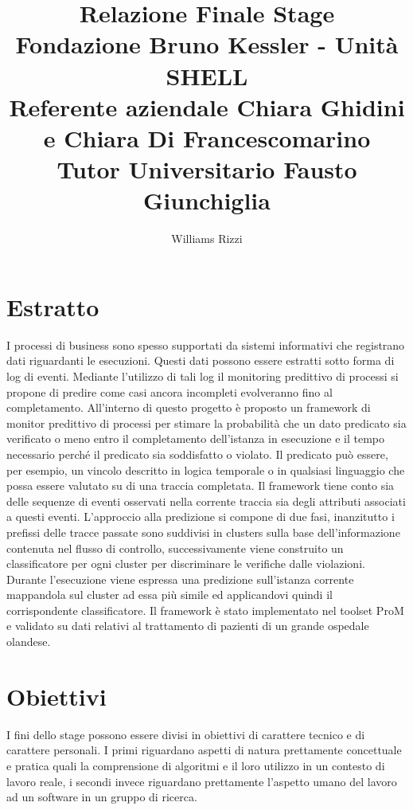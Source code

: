 \documentclass[11pt]{article} %
\title{%
	Relazione Finale Stage\\
 	 \large Fondazione Bruno Kessler - Unità SHELL \\
   	 Referente aziendale Chiara Ghidini e Chiara Di Francescomarino\\
	Tutor Universitario Fausto Giunchiglia}
\author{Williams Rizzi}
\begin{document}
\maketitle

\section{Estratto}
I processi di business sono spesso supportati da sistemi informativi che registrano dati riguardanti le esecuzioni. Questi dati possono essere estratti sotto forma di log di eventi. Mediante l'utilizzo di tali log il monitoring predittivo di processi si propone di predire come casi ancora incompleti evolveranno fino al completamento. All'interno di questo progetto è proposto un framework di monitor predittivo di processi per stimare la probabilità che un dato predicato sia verificato o meno entro il completamento dell'istanza in esecuzione e il tempo necessario perché il predicato sia soddisfatto o violato. Il predicato può essere, per esempio, un vincolo descritto in logica temporale o in qualsiasi linguaggio che possa essere valutato su di una traccia completata. Il framework tiene conto sia delle sequenze di eventi osservati nella corrente traccia sia degli attributi associati a questi eventi. L'approccio alla predizione si compone di due fasi, inanzitutto i prefissi delle tracce passate sono suddivisi in clusters sulla base dell'informazione contenuta nel flusso di controllo, successivamente viene construito un classificatore per ogni cluster per discriminare le verifiche dalle violazioni. Durante l'esecuzione viene espressa una predizione sull'istanza corrente mappandola sul cluster ad essa più simile ed applicandovi quindi il corrispondente classificatore.
Il framework è stato implementato nel toolset ProM e validato su dati relativi al trattamento di pazienti di un grande ospedale olandese.

\section{Obiettivi}
I fini dello stage possono essere divisi in obiettivi di carattere tecnico e di carattere personali. I primi riguardano aspetti di natura prettamente concettuale e pratica quali la comprensione di algoritmi e il loro utilizzo in un contesto di lavoro reale, i secondi invece riguardano prettamente l'aspetto umano del lavoro ad un software in un gruppo di ricerca.
\end{document}
